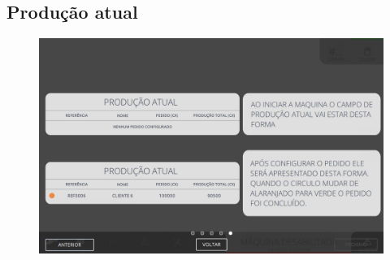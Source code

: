\newpage
\thispagestyle{fancy}
\vspace{\fill}

\subsection{\small{Produção atual}}

\begin{figure}
    \centering
    \includegraphics[width=576 px,height=360 px]{src/imagesICV/01-main/6.png}
\end{figure}
